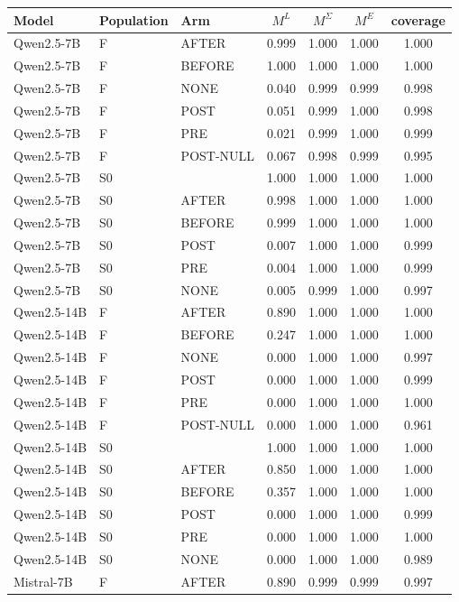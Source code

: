 \begin{tabular}{lllcccc}
\toprule
Model & Population & Arm & $M^L$ & $M^\Sigma$ & $M^E$ & coverage \\
\midrule
Qwen2.5-7B & F & AFTER & 0.999 & 1.000 & 1.000 & 1.000 \\
Qwen2.5-7B & F & BEFORE & 1.000 & 1.000 & 1.000 & 1.000 \\
Qwen2.5-7B & F & NONE & 0.040 & 0.999 & 0.999 & 0.998 \\
Qwen2.5-7B & F & POST & 0.051 & 0.999 & 1.000 & 0.998 \\
Qwen2.5-7B & F & PRE & 0.021 & 0.999 & 1.000 & 0.999 \\
Qwen2.5-7B & F & POST-NULL & 0.067 & 0.998 & 0.999 & 0.995 \\
Qwen2.5-7B & S0 & \fmtOpt{} & 1.000 & 1.000 & 1.000 & 1.000 \\
Qwen2.5-7B & S0 & AFTER & 0.998 & 1.000 & 1.000 & 1.000 \\
Qwen2.5-7B & S0 & BEFORE & 0.999 & 1.000 & 1.000 & 1.000 \\
Qwen2.5-7B & S0 & POST & 0.007 & 1.000 & 1.000 & 0.999 \\
Qwen2.5-7B & S0 & PRE & 0.004 & 1.000 & 1.000 & 0.999 \\
Qwen2.5-7B & S0 & NONE & 0.005 & 0.999 & 1.000 & 0.997 \\
Qwen2.5-14B & F & AFTER & 0.890 & 1.000 & 1.000 & 1.000 \\
Qwen2.5-14B & F & BEFORE & 0.247 & 1.000 & 1.000 & 1.000 \\
Qwen2.5-14B & F & NONE & 0.000 & 1.000 & 1.000 & 0.997 \\
Qwen2.5-14B & F & POST & 0.000 & 1.000 & 1.000 & 0.999 \\
Qwen2.5-14B & F & PRE & 0.000 & 1.000 & 1.000 & 1.000 \\
Qwen2.5-14B & F & POST-NULL & 0.000 & 1.000 & 1.000 & 0.961 \\
Qwen2.5-14B & S0 & \fmtOpt{} & 1.000 & 1.000 & 1.000 & 1.000 \\
Qwen2.5-14B & S0 & AFTER & 0.850 & 1.000 & 1.000 & 1.000 \\
Qwen2.5-14B & S0 & BEFORE & 0.357 & 1.000 & 1.000 & 1.000 \\
Qwen2.5-14B & S0 & POST & 0.000 & 1.000 & 1.000 & 0.999 \\
Qwen2.5-14B & S0 & PRE & 0.000 & 1.000 & 1.000 & 1.000 \\
Qwen2.5-14B & S0 & NONE & 0.000 & 1.000 & 1.000 & 0.989 \\
Mistral-7B & F & AFTER & 0.890 & 0.999 & 0.999 & 0.997 \\

\end{tabular}
